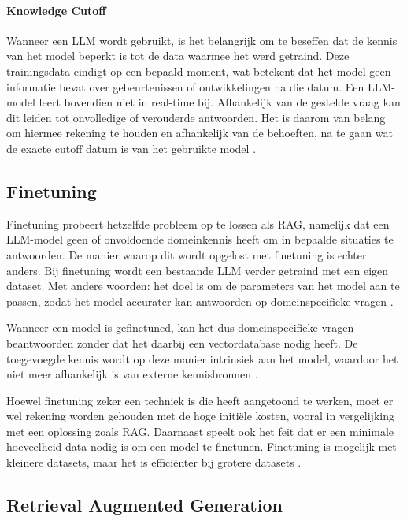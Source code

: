 \paragraph{Knowledge Cutoff}

Wanneer een LLM wordt gebruikt, is het belangrijk om te beseffen dat de kennis van het model beperkt is tot de data waarmee het werd getraind. Deze trainingsdata eindigt op een bepaald moment, wat betekent dat het model geen informatie bevat over gebeurtenissen of ontwikkelingen na die datum. Een LLM-model leert bovendien niet in real-time bij. Afhankelijk van de gestelde vraag kan dit leiden tot onvolledige of verouderde antwoorden. Het is daarom van belang om hiermee rekening te houden en afhankelijk van de behoeften, na te gaan wat de exacte cutoff datum is van het gebruikte model \autocite{Hadi2023}.
 
\subsection{Finetuning}
 
Finetuning probeert hetzelfde probleem op te lossen als RAG, namelijk dat een LLM-model geen of onvoldoende domeinkennis heeft om in bepaalde situaties te antwoorden. De manier waarop dit wordt opgelost met finetuning is echter anders. Bij finetuning wordt een bestaande LLM verder getraind met een eigen dataset. Met andere woorden: het doel is om de parameters van het model aan te passen, zodat het model accurater kan antwoorden op domeinspecifieke vragen \autocite{Raj2024}.

Wanneer een model is gefinetuned, kan het dus domeinspecifieke vragen beantwoorden zonder dat het daarbij een vectordatabase nodig heeft. De toegevoegde kennis wordt op deze manier intrinsiek aan het model, waardoor het niet meer afhankelijk is van externe kennisbronnen \autocite{Raj2024}.

Hoewel finetuning zeker een techniek is die heeft aangetoond te werken, moet er wel rekening worden gehouden met de hoge initiële kosten, vooral in vergelijking met een oplossing zoals RAG. Daarnaast speelt ook het feit dat er een minimale hoeveelheid data nodig is om een model te finetunen. Finetuning is mogelijk met kleinere datasets, maar het is efficiënter bij grotere datasets \autocite{Balaguer2024}.

 
\subsection{Retrieval Augmented Generation}

